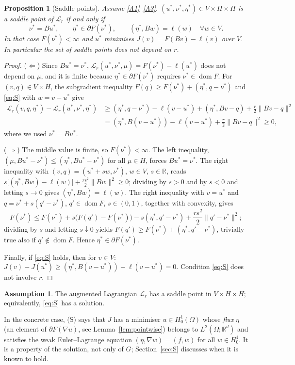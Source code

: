 \documentclass[11pt]{amsart}
\newtheorem{proposition}[theorem]{Proposition}
\theoremstyle{definition}
\newtheorem{assumption}{Assumption}
\theoremstyle{remark}
\numberwithin{equation}{section}
\newcommand{\R}{\mathbb{R}}
\newcommand{\Lag}{\mathcal{L}_r}
\newcommand{\norm}[1]{\lVert #1\rVert}
\DeclareMathOperator{\dom}{dom}
\begin{document}
\begin{proposition}[Saddle points]\label{prop:saddle}
Assume \ref{A1}--\ref{A3}. $(u^*,\nu^*,\eta^*)\in V\times H\times H$ is a saddle point of $\Lag$ if and only if
\begin{equation}\label{eq:S}
\nu^*=Bu^*,\qquad \eta^*\in\partial F(\nu^*),\qquad (\eta^*,Bw)=\ell(w)\quad\forall w\in V .
\end{equation}
In that case $F(\nu^*)<\infty$ and $u^*$ minimises $J(v)=F(Bv)-\ell(v)$ over $V$. In particular the set of saddle points does not depend on $r$.
\end{proposition}
\begin{proof}
($\Leftarrow$) Since $Bu^*=\nu^*$, $\Lag(u^*,\nu^*,\mu)=F(\nu^*)-\ell(u^*)$ does not depend on $\mu$, and it is finite because $\eta^*\in\partial F(\nu^*)$ requires $\nu^*\in\dom F$. For $(v,q)\in V\times H$, the subgradient inequality $F(q)\ge F(\nu^*)+(\eta^*,q-\nu^*)$ and \eqref{eq:S} with $w=v-u^*$ give
\[
\begin{aligned}
\Lag(v,q,\eta^*)-\Lag(u^*,\nu^*,\eta^*)&\ge(\eta^*,q-\nu^*)-\ell(v-u^*)+(\eta^*,Bv-q)+\frac r2\norm{Bv-q}^2\\
&=(\eta^*,B(v-u^*))-\ell(v-u^*)+\frac r2\norm{Bv-q}^2\ge0 ,
\end{aligned}
\]
where we used $\nu^*=Bu^*$.

($\Rightarrow$) The middle value is finite, so $F(\nu^*)<\infty$. The left inequality, $(\mu,Bu^*-\nu^*)\le(\eta^*,Bu^*-\nu^*)$ for all $\mu\in H$, forces $Bu^*=\nu^*$. The right inequality with $(v,q)=(u^*+sw,\nu^*)$, $w\in V$, $s\in\R$, reads $s\big[(\eta^*,Bw)-\ell(w)\big]+\frac{rs^2}2\norm{Bw}^2\ge0$; dividing by $s>0$ and by $s<0$ and letting $s\to0$ gives $(\eta^*,Bw)=\ell(w)$. The right inequality with $v=u^*$ and $q=\nu^*+s(q'-\nu^*)$, $q'\in\dom F$, $s\in(0,1)$, together with convexity, gives
\[
F(\nu^*)\le F(\nu^*)+s\big(F(q')-F(\nu^*)\big)-s(\eta^*,q'-\nu^*)+\frac{rs^2}2\norm{q'-\nu^*}^2 ;
\]
dividing by $s$ and letting $s\downarrow0$ yields $F(q')\ge F(\nu^*)+(\eta^*,q'-\nu^*)$, trivially true also if $q'\notin\dom F$. Hence $\eta^*\in\partial F(\nu^*)$.

Finally, if \eqref{eq:S} holds, then for $v\in V$: $J(v)-J(u^*)\ge(\eta^*,B(v-u^*))-\ell(v-u^*)=0$. Condition \eqref{eq:S} does not involve $r$.
\end{proof}

\begin{assumption}\label{ass:S}
The augmented Lagrangian $\Lag$ has a saddle point in $V\times H\times H$; equivalently, \eqref{eq:S} has a solution.
\end{assumption}
In the concrete case, (S) says that $J$ has a minimiser $u\in H^1_0(\Omega)$ whose \emph{flux} $\eta$ (an element of $\partial F(\nabla u)$, see Lemma~\ref{lem:pointwise}) belongs to $L^2(\Omega;\R^d)$ and satisfies the weak Euler--Lagrange equation $(\eta,\nabla w)=(f,w)$ for all $w\in H^1_0$. It is a property of the solution, not only of $G$; Section~\ref{sec:S} discusses when it is known to hold.
\end{document}
